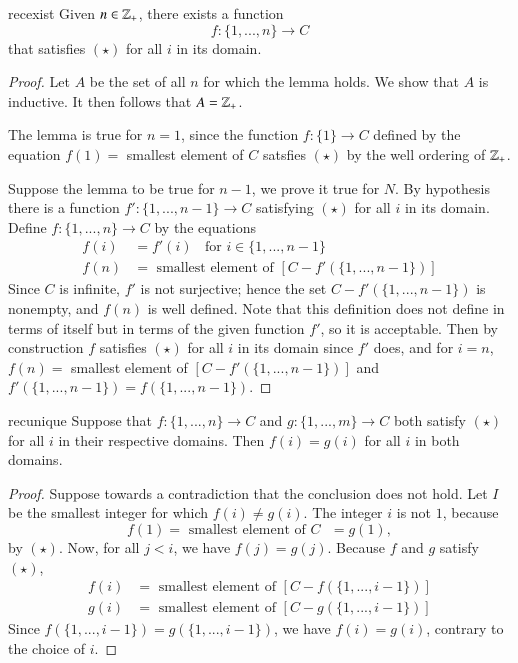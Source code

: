 \documentclass[12pt, a4paper, oneside, openright, titlepage]{book}
\begin{document}
\begin{appendices}
    \begin{lem}{}{recexist}
        Given $n \in \mathbb Z_+$, there exists a function \begin{equation*}
            f:\{1,...,n\}\rightarrow C
        \end{equation*}
        that satisfies $(\star)$ for all $i$ in its domain.
    \end{lem}
    \begin{proof}
        Let $A$ be the set of all $n$ for which the lemma holds. We show that $A$ is inductive. It then follows that $A = \mathbb Z_+$.


        The lemma is true for $n=1$, since the function $f:\{1\}\rightarrow C$ defined by the equation $f(1) = $ smallest element of $C$ satsfies $(\star)$ by the well ordering of $\mathbb Z_+$.

        Suppose the lemma to be true for $n-1$, we prove it true for $N$. By hypothesis there is a function $f':\{1,...,n-1\}\rightarrow C$ satisfying $(\star)$ for all $i$ in its domain. Define $f:\{1,...,n\}\rightarrow C$ by the equations \begin{align*}
            f(i) &= f'(i)\;\;\text{ for } i\in\{1,...,n-1\} \\
            f(n) &= \text{ smallest element of } [C-f'(\{1,...,n-1\})]
        \end{align*}
        Since $C$ is infinite, $f'$ is not surjective; hence the set $C-f'(\{1,...,n-1\})$ is nonempty, and $f(n)$ is well defined. Note that this definition does not define in terms of itself but in terms of the given function $f'$, so it is acceptable. Then by construction $f$ satisfies $(\star)$ for all $i$ in its domain since $f'$ does, and for $i = n$, $f(n) = $ smallest element of $[C-f'(\{1,...,n-1\})]$ and $f'(\{1,...,n-1\}) = f(\{1,...,n-1\})$.
    \end{proof}

    \begin{lem}{}{recunique}
        Suppose that $f:\{1,...,n\}\rightarrow C$ and $g:\{1,...,m\}\rightarrow C$ both satisfy $(\star)$ for all $i$ in their respective domains. Then $f(i) = g(i)$ for all $i$ in both domains.
    \end{lem}
    \begin{proof}
        Suppose towards a contradiction that the conclusion does not hold. Let $I$ be the smallest integer for which $f(i) \neq g(i)$. The integer $i$ is not $1$, because \begin{equation*}
            f(1) = \text{ smallest element of $C$ } = g(1),
        \end{equation*}
        by $(\star)$. Now, for all $j < i$, we have $f(j) = g(j)$. Because $f$ and $g$ satisfy $(\star)$, \begin{align*}
            f(i) &= \text{ smallest element of } [C-f(\{1,...,i-1\})] \\
            g(i) &= \text{ smallest element of } [C-g(\{1,...,i-1\})]
        \end{align*}
        Since $f(\{1,...,i-1\}) = g(\{1,...,i-1\})$, we have $f(i) = g(i)$, contrary to the choice of $i$.
    \end{proof}



\end{appendices}
\end{document}
